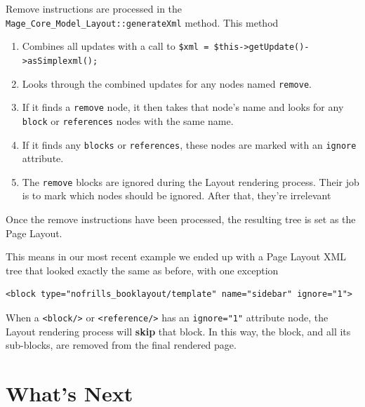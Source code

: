 \documentclass[oneside]{book}
\begin{document}
Remove instructions are processed in the \footnotesize\texttt{Mage\_Core\_Model\_Layout::generateXml} \normalsize  method.  This method

\begin{enumerate}
\item Combines all updates with a call to \footnotesize\texttt{\$xml = \$this-\textgreater getUpdate()-\textgreater asSimplexml();} \normalsize
\item Looks through the combined updates for any nodes named \footnotesize\texttt{remove}\normalsize.
\item If it finds a \footnotesize\texttt{remove} \normalsize  node, it then takes that node's name and looks for any \footnotesize\texttt{block} \normalsize  or \footnotesize\texttt{references} \normalsize  nodes with the same name.
\item If it finds any \footnotesize\texttt{blocks} \normalsize  or \footnotesize\texttt{references}\normalsize, these nodes are marked with an \footnotesize\texttt{ignore} \normalsize  attribute.
\item The \footnotesize\texttt{remove} \normalsize  blocks are ignored during the Layout rendering process.  Their job is to mark which nodes should be ignored.  After that, they're irrelevant
\end{enumerate}


Once the remove instructions have been processed, the resulting tree is set as the Page Layout.

This means in our most recent example we ended up with a Page Layout XML tree that looked exactly the same as before, with one exception

\begin{lstlisting}
<block type="nofrills_booklayout/template" name="sidebar" ignore="1">

\end{lstlisting}


When a \footnotesize\texttt{\textless block/\textgreater } \normalsize  or \footnotesize\texttt{\textless reference/\textgreater } \normalsize  has an \footnotesize\texttt{ignore="1"} \normalsize  attribute node, the Layout rendering process will \textbf{skip} that block.  In this way, the block, and all its sub-blocks, are removed from the final rendered page.

\section{What's Next}
\end{document}
